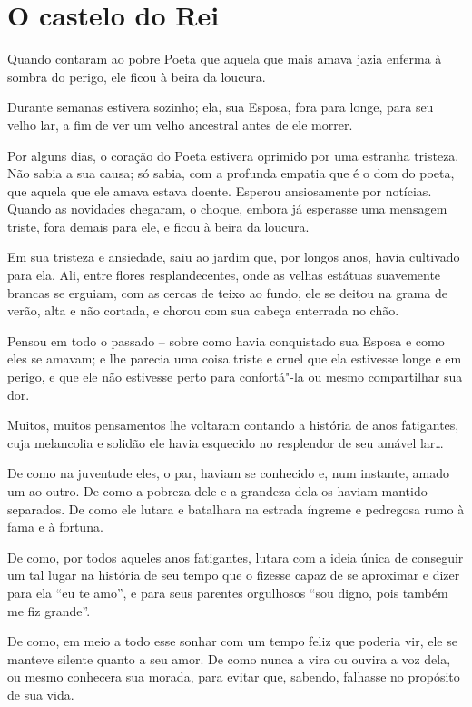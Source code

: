 \chapter{O castelo do Rei}

Quando contaram ao pobre Poeta que aquela que mais amava jazia
enferma à sombra do perigo, ele ficou à beira da loucura.

Durante semanas estivera sozinho; ela, sua Esposa, fora para longe, para
seu velho lar, a fim de ver um velho ancestral antes de ele morrer.

Por alguns dias, o coração do Poeta estivera oprimido por uma estranha
tristeza. Não sabia a sua causa; só sabia, com a profunda empatia
que é o dom do poeta, que aquela que ele amava estava doente. Esperou
ansiosamente por notícias. Quando as novidades chegaram, o choque,
embora já esperasse uma mensagem triste, fora demais para ele, e
ficou à beira da loucura.

Em sua tristeza e ansiedade, saiu ao jardim que, por longos anos, havia
cultivado para ela. Ali, entre flores resplandecentes, onde as velhas
estátuas suavemente brancas se erguiam, com as cercas de teixo ao fundo,
ele se deitou na grama de verão, alta e não cortada, e chorou com sua
cabeça enterrada no chão.

Pensou em todo o passado -- sobre como havia conquistado sua Esposa
e como eles se amavam; e lhe parecia uma coisa triste e cruel que ela
estivesse longe e em perigo, e que ele não estivesse perto para
confortá"-la ou mesmo compartilhar sua dor.

Muitos, muitos pensamentos lhe voltaram contando a história de anos
fatigantes, cuja melancolia e solidão ele havia esquecido no resplendor
de seu amável lar\ldots{}

De como na juventude eles, o par, haviam se conhecido e, num instante,
amado um ao outro. De como a pobreza dele e a grandeza dela os haviam
mantido separados. De como ele lutara e batalhara na estrada íngreme e
pedregosa rumo à fama e à fortuna.

De como, por todos aqueles anos fatigantes, lutara com a 
ideia única de conseguir um tal lugar na história de seu tempo que o fizesse
capaz de se aproximar e dizer para ela ``eu te amo'', e para seus
parentes orgulhosos ``sou digno, pois também me fiz grande''.

De como, em meio a todo esse sonhar com um tempo feliz que poderia vir,
ele se manteve silente quanto a seu amor. De como nunca a vira ou ouvira
a voz dela, ou mesmo conhecera sua morada, para evitar que, sabendo,
falhasse no propósito de sua vida.

